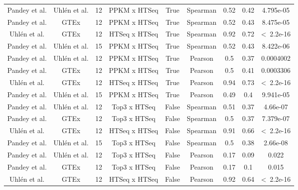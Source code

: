 \begin{landscape}
\begin{longtable}{@{}ccccccccc@{}}
Pandey et al. & Uhlén et al. & 12 & PPKM x HTSeq & True & Spearman & 0.52 & 0.42 & 4.795e-05 \\
Pandey et al. & GTEx & 12 & PPKM x HTSeq & True & Spearman & 0.52 & 0.43 & 8.475e-05 \\
{\color[HTML]{9B9B9B} Uhlén et al.} & {\color[HTML]{9B9B9B} GTEx} & {\color[HTML]{9B9B9B} 12} & {\color[HTML]{9B9B9B} HTSeq x HTSeq} & {\color[HTML]{9B9B9B} True} & {\color[HTML]{9B9B9B} Spearman} & {\color[HTML]{9B9B9B} 0.92} & {\color[HTML]{9B9B9B} 0.72} & {\color[HTML]{9B9B9B} \textless\ 2.2e-16} \\
Pandey et al. & Uhlén et al. & 15 & PPKM x HTSeq & True & Spearman & 0.52 & 0.43 & 8.422e-06 \\
Pandey et al. & Uhlén et al. & 12 & PPKM x HTSeq & True & Pearson & 0.5 & 0.37 & 0.0004002 \\
Pandey et al. & GTEx & 12 & PPKM x HTSeq & True & Pearson & 0.5 & 0.41 & 0.0003306 \\
{\color[HTML]{9B9B9B} Uhlén et al.} & {\color[HTML]{9B9B9B} GTEx} & {\color[HTML]{9B9B9B} 12} & {\color[HTML]{9B9B9B} HTSeq x HTSeq} & {\color[HTML]{9B9B9B} True} & {\color[HTML]{9B9B9B} Pearson} & {\color[HTML]{9B9B9B} 0.94} & {\color[HTML]{9B9B9B} 0.73} & {\color[HTML]{9B9B9B} \textless\ 2.2e-16} \\
Pandey et al. & Uhlén et al. & 15 & PPKM x HTSeq & True & Pearson & 0.49 & 0.4 & 9.941e-05 \\* \midrule
Pandey et al. & Uhlén et al. & 12 & Top3 x HTSeq & False & Spearman & 0.51 & 0.37 & 4.66e-07 \\
Pandey et al. & GTEx & 12 & Top3 x HTSeq & False & Spearman & 0.5 & 0.37 & 7.379e-07 \\
{\color[HTML]{9B9B9B} Uhlén et al.} & {\color[HTML]{9B9B9B} GTEx} & {\color[HTML]{9B9B9B} 12} & {\color[HTML]{9B9B9B} HTSeq x HTSeq} & {\color[HTML]{9B9B9B} False} & {\color[HTML]{9B9B9B} Spearman} & {\color[HTML]{9B9B9B} 0.91} & {\color[HTML]{9B9B9B} 0.66} & {\color[HTML]{9B9B9B} \textless\ 2.2e-16} \\
Pandey et al. & Uhlén et al. & 15 & Top3 x HTSeq & False & Spearman & 0.5 & 0.38 & 2.66e-08 \\
Pandey et al. & Uhlén et al. & 12 & Top3 x HTSeq & False & Pearson & 0.17 & 0.09 & 0.022 \\
Pandey et al. & GTEx & 12 & Top3 x HTSeq & False & Pearson & 0.17 & 0.1 & 0.015 \\
{\color[HTML]{9B9B9B} Uhlén et al.} & {\color[HTML]{9B9B9B} GTEx} & {\color[HTML]{9B9B9B} 12} & {\color[HTML]{9B9B9B} HTSeq x HTSeq} & {\color[HTML]{9B9B9B} False} & {\color[HTML]{9B9B9B} Pearson} & {\color[HTML]{9B9B9B} 0.92} & {\color[HTML]{9B9B9B} 0.64} & {\color[HTML]{9B9B9B} \textless\ 2.2e-16} \\

\end{longtable}
\end{landscape}
